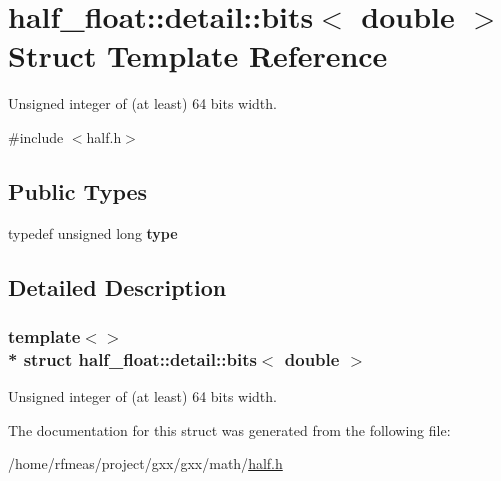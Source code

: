 \hypertarget{structhalf__float_1_1detail_1_1bits_3_01double_01_4}{}\section{half\+\_\+float\+:\+:detail\+:\+:bits$<$ double $>$ Struct Template Reference}
\label{structhalf__float_1_1detail_1_1bits_3_01double_01_4}


Unsigned integer of (at least) 64 bits width.  




{\ttfamily \#include $<$half.\+h$>$}

\subsection*{Public Types}
\begin{DoxyCompactItemize}
\item 
typedef unsigned long {\bfseries type}\hypertarget{structhalf__float_1_1detail_1_1bits_3_01double_01_4_aaa442f347d77cb5ed8a8331afd31636d}{}\label{structhalf__float_1_1detail_1_1bits_3_01double_01_4_aaa442f347d77cb5ed8a8331afd31636d}

\end{DoxyCompactItemize}


\subsection{Detailed Description}
\subsubsection*{template$<$$>$\\*
struct half\+\_\+float\+::detail\+::bits$<$ double $>$}

Unsigned integer of (at least) 64 bits width. 

The documentation for this struct was generated from the following file\+:\begin{DoxyCompactItemize}
\item 
/home/rfmeas/project/gxx/gxx/math/\hyperlink{half_8h}{half.\+h}\end{DoxyCompactItemize}
